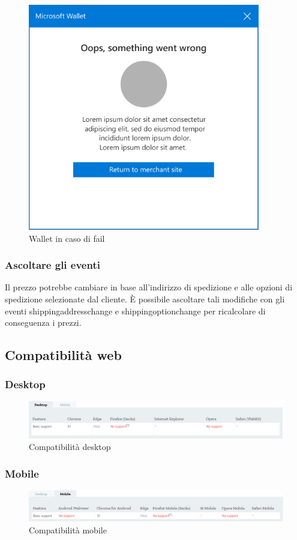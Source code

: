 \documentclass[11pt ,a4paper , twoside , openright ]{article}
\begin{document}
\begin{figure}[h]
	\centering
	\includegraphics[width=0.5\linewidth]{wallet3}
	\caption{Wallet in caso di fail}
	\label{fig: Wallet in caso di fail}
\end{figure}
\pagebreak
\subsubsection{Ascoltare gli eventi}
Il prezzo potrebbe cambiare in base all'indirizzo di spedizione e alle opzioni di spedizione selezionate dal cliente. È possibile ascoltare tali modifiche con gli eventi shippingaddresschange e shippingoptionchange per ricalcolare di conseguenza i prezzi.


\subsection{Compatibilità web}
\subsubsection{Desktop}
\begin{figure}[h]
	\centering
	\includegraphics[width=1\linewidth]{Compatibilita1}
	\caption{Compatibilità desktop}
	\label{fig: Compatibilità desktop}
\end{figure}
\subsubsection{Mobile}
\begin{figure}[h]
	\centering
	\includegraphics[width=1\linewidth]{Compatibilita2}
	\caption{Compatibilità mobile}
	\label{fig: Compatibilità mobile}
\end{figure}
\end{document}
